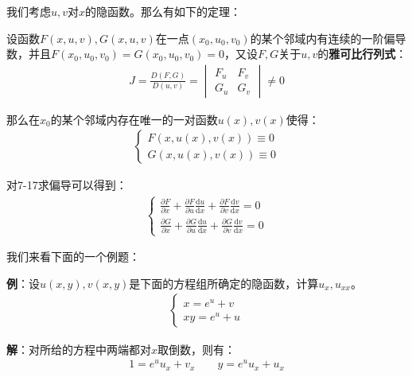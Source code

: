 \documentclass{ctexart}
\let\oldtextbf\textbf %
\renewcommand{\textbf}[1]{\textcolor{btex}{\oldtextbf{#1}}} %
\begin{document}
我们考虑$u,v$对$x$的隐函数。那么有如下的定理：
\begin{tcolorbox}[
    colback=bac1,     %
    colframe=fra1,   %
    coltitle=white,             %
    coltext=tex1,
    title=隐函数存在定理（2方程，3未知数）,
    fonttitle=\bfseries,        %
arc=3mm,                     %
breakable
]
设函数$F(x,u,v),G(x,u,v)$在一点$(x_0,u_0,v_0)$的某个邻域内有连续的一阶偏导数，并且$F(x_0,u_0,v_0)=G(x_0,u_0,v_0)=0$，又设$F,G$关于$u,v$的\textbf{雅可比行列式}：
\begin{align*}
    J=\frac{D(F,G)}{D(u,v)}=\begin{vmatrix}
        F_u & F_v\\
        G_u & G_v
    \end{vmatrix}\neq 0\tag{7-16}
\end{align*}

那么在$x_0$的某个邻域内存在唯一的一对函数$u(x),v(x)$使得：
\begin{align*}
    \begin{cases}
        F(x,u(x),v(x))\equiv 0\\
        G(x,u(x),v(x))\equiv 0
    \end{cases}\tag{7-17}
\end{align*}

对7-17求偏导可以得到：
\begin{align*}
    \begin{cases}
        \frac{\partial F}{\partial x}+\frac{\partial F}{\partial u}\frac{\mathrm{d}u}{\mathrm{d}x}
+  \frac{\partial F}{\partial v}\frac{\mathrm{d}v}{\mathrm{d}x}=0\\
       \frac{\partial G}{\partial x}+\frac{\partial G}{\partial u}\frac{\mathrm{d}u}{\mathrm{d}x}
+  \frac{\partial G}{\partial v}\frac{\mathrm{d}v}{\mathrm{d}x}=0
    \end{cases}\tag{7-18} 
\end{align*}
\end{tcolorbox}

我们来看下面的一个例题：

\textbf{例}：设$u(x,y),v(x,y)$是下面的方程组所确定的隐函数，计算$u_x,u_{xx}$。
\begin{align*}
    \begin{cases}
        x=e^u+v\\
        xy=e^u+u
    \end{cases}
\end{align*}

\textbf{解}：对所给的方程中两端都对$x$取倒数，则有：
\begin{align*}
    1=e^u u_x+v_x\qquad y=e^uu_x+u_x
\end{align*}
\end{document}
